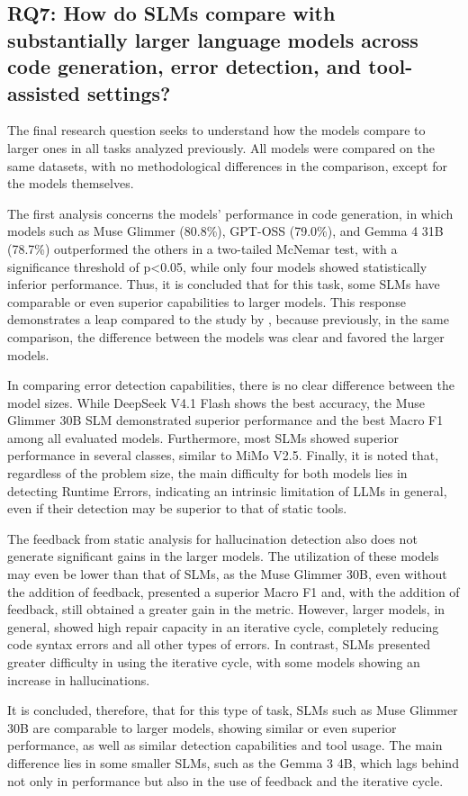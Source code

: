 \subsection{RQ7: How do SLMs compare with substantially larger language models across code generation, error detection, and tool-assisted settings?}

The final research question seeks to understand how the models compare to larger ones in all tasks analyzed previously. All models were compared on the same datasets, with no methodological differences in the comparison, except for the models themselves.

The first analysis concerns the models' performance in code generation, in which models such as Muse Glimmer (80.8\%), GPT-OSS (79.0\%), and Gemma 4 31B (78.7\%) outperformed the others in a two-tailed McNemar test, with a significance threshold of p<0.05, while only four models showed statistically inferior performance. Thus, it is concluded that for this task, some SLMs have comparable or even superior capabilities to larger models. This response demonstrates a leap compared to the study by , because previously, in the same comparison, the difference between the models was clear and favored the larger models.

In comparing error detection capabilities, there is no clear difference between the model sizes. While DeepSeek V4.1 Flash shows the best accuracy, the Muse Glimmer 30B SLM demonstrated superior performance and the best Macro F1 among all evaluated models. Furthermore, most SLMs showed superior performance in several classes, similar to MiMo V2.5. Finally, it is noted that, regardless of the problem size, the main difficulty for both models lies in detecting Runtime Errors, indicating an intrinsic limitation of LLMs in general, even if their detection may be superior to that of static tools.

The feedback from static analysis for hallucination detection also does not generate significant gains in the larger models. The utilization of these models may even be lower than that of SLMs, as the Muse Glimmer 30B, even without the addition of feedback, presented a superior Macro F1 and, with the addition of feedback, still obtained a greater gain in the metric. However, larger models, in general, showed high repair capacity in an iterative cycle, completely reducing code syntax errors and all other types of errors. In contrast, SLMs presented greater difficulty in using the iterative cycle, with some models showing an increase in hallucinations.

It is concluded, therefore, that for this type of task, SLMs such as Muse Glimmer 30B are comparable to larger models, showing similar or even superior performance, as well as similar detection capabilities and tool usage. The main difference lies in some smaller SLMs, such as the Gemma 3 4B, which lags behind not only in performance but also in the use of feedback and the iterative cycle.